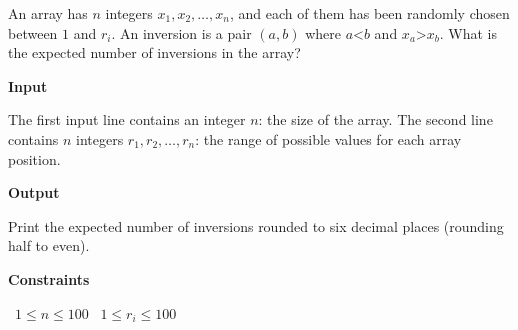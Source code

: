 An array has $n$ integers $x_1,x_2,\dots,x_n$, and each of them has been randomly chosen between $1$ and $r_i$. An inversion is a pair $(a,b)$ where $a$<$b$ and $x_a$>$x_b$.
What is the expected number of inversions in the array?

\vspace{0.3cm}\noindent\textbf{Input}

The first input line contains an integer $n$: the size of the array.
The second line contains $n$ integers $r_1,r_2,\dots,r_n$: the range of possible values for each array position.

\vspace{0.3cm}\noindent\textbf{Output}

Print the expected number of inversions rounded to six decimal places (rounding half to even).

\vspace{0.3cm}\noindent\textbf{Constraints}

\textbullet\ $1 \le n \le 100$
\textbullet\ $1 \le r_i \le 100$